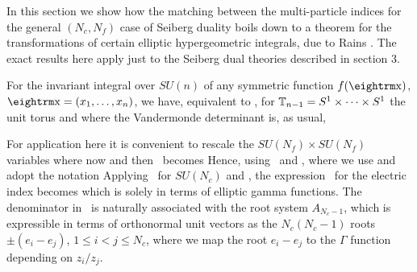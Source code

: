 
In this section we show how the matching between the
multi-particle indices for the general $(N_c,N_f)$ case of
Seiberg duality boils down to a theorem for the transformations of certain elliptic
hypergeometric integrals, due to Rains \rains.  The exact results here apply
just to the Seiberg dual theories described in section 3.

For the invariant integral over $SU(n)$ of any symmetric function $f(\x)$,
$\x=(x_1, \dots , x_{n})$, we have, equivalent to \intth,
\eqn{}
for $\Bbb T_{n-1} = S^1 \times \dots \times S^1$ the unit torus and 
where the Vandermonde determinant is, as usual,
\eqn{}

For application here it is convenient to rescale the $SU(N_f) \times SU(N_f)$ variables
\eqn{}
where now 
\eqn{}
and then \seiel\ becomes
\eqn{}
Hence, using \eGam\ and \eThe,
\eqn{}
where we use
\eqn{}
and adopt the notation
\eqn{}
Applying \invG\ for $SU(N_c)$ and \psum, the expression \itwo\ for the electric index
becomes
\eqn{}
which is solely in terms of elliptic gamma functions. The denominator in \indexE\
is naturally associated with the root system $A_{N_c-1}$, which is expressible
in terms of orthonormal unit vectors as the $N_c(N_c-1)$ roots 
$\pm(e_i-e_j)$, $1\leq i<j\leq N_c$, where we map the root $e_i-e_j$ to
the $\Gamma$ function depending on $ z_i/z_j$.

